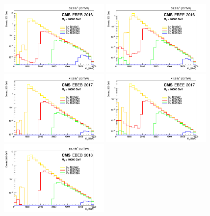 \begin{figure}[tbp!]
\begin{center}
\includegraphics[angle=0,width=0.48\textwidth]{fig/2016EBEB.png}
\includegraphics[angle=0,width=0.48\textwidth]{fig/2016EBEE.png}
\includegraphics[angle=0,width=0.48\textwidth]{fig/2017EBEB.png}
\includegraphics[angle=0,width=0.48\textwidth]{fig/2017EBEE.png}
\includegraphics[angle=0,width=0.48\textwidth]{fig/2018EBEB.png}

\end{center}
\end{figure}
